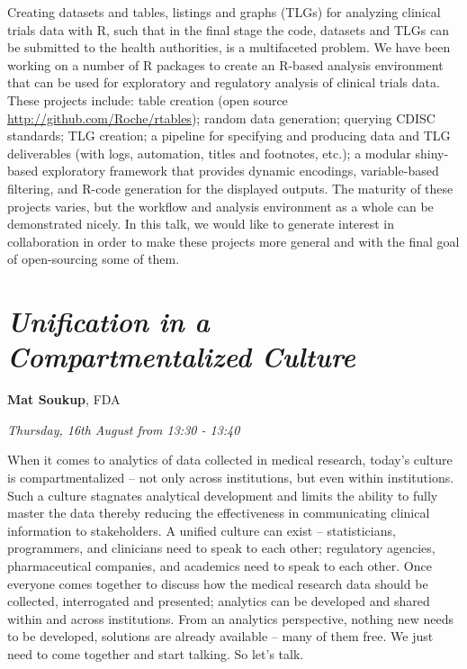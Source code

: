 \documentclass[]{book}
\theoremstyle{definition}
\theoremstyle{definition}
\theoremstyle{definition}
\theoremstyle{remark}
\begin{document}
Creating datasets and tables, listings and graphs (TLGs) for analyzing
clinical trials data with R, such that in the final stage the code,
datasets and TLGs can be submitted to the health authorities, is a
multifaceted problem. We have been working on a number of R packages to
create an R-based analysis environment that can be used for exploratory
and regulatory analysis of clinical trials data. These projects include:
table creation (open source \url{http://github.com/Roche/rtables});
random data generation; querying CDISC standards; TLG creation; a
pipeline for specifying and producing data and TLG deliverables (with
logs, automation, titles and footnotes, etc.); a modular shiny-based
exploratory framework that provides dynamic encodings, variable-based
filtering, and R-code generation for the displayed outputs. The maturity
of these projects varies, but the workflow and analysis environment as a
whole can be demonstrated nicely. In this talk, we would like to
generate interest in collaboration in order to make these projects more
general and with the final goal of open-sourcing some of them.

\hypertarget{unification-in-a-compartmentalized-culture-1}{%
\section{\texorpdfstring{\emph{Unification in a Compartmentalized
Culture}}{Unification in a Compartmentalized Culture}}\label{unification-in-a-compartmentalized-culture-1}}

\textbf{Mat Soukup}, FDA

\emph{Thursday, 16th August from 13:30 - 13:40}

When it comes to analytics of data collected in medical research,
today's culture is compartmentalized -- not only across institutions,
but even within institutions. Such a culture stagnates analytical
development and limits the ability to fully master the data thereby
reducing the effectiveness in communicating clinical information to
stakeholders. A unified culture can exist -- statisticians, programmers,
and clinicians need to speak to each other; regulatory agencies,
pharmaceutical companies, and academics need to speak to each other.
Once everyone comes together to discuss how the medical research data
should be collected, interrogated and presented; analytics can be
developed and shared within and across institutions. From an analytics
perspective, nothing new needs to be developed, solutions are already
available -- many of them free. We just need to come together and start
talking. So let's talk.
\end{document}

